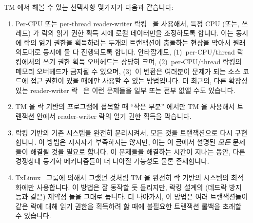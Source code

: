 TM 에서 해볼 수 있는 선택사항 몇가지가 다음과 같습니다:

\begin{enumerate}
\item	Per-CPU 또는 per-thread reader-writer 락킹~\cite{WilsonCHsieh92a} 을
	사용해서, 특정 CPU (또는, 쓰레드) 가 락의 읽기 권한 획득 시에 로컬
	데이터만을 조정하도록 합니다.
	이는 동시에 락의 읽기 권한을 획득하려는 두개의 트랜잭션이 충돌하는
	현상을 막아서 원래 의도대로 동시에 둘 다 진행되도록 합니다.
	안타깝게도, (1)~per-CPU/thread 락킹에서의 쓰기 권한 획득 오버헤드는
	상당히 크며, (2)~per-CPU/thread 락킹의 메모리 오버헤드가 금지될 수
	있으며, (3)~이 변환은 여러분이 문제가 되는 소스 코드에 접근 권한이 있을
	때에만 사용할 수 있는 방법입니다.
	더 최근의, 다른 확장성 있는 reader-writer
	락~\cite{YossiLev2009SNZIrwlock} 은 이런 문제들을 일부 또는 전부 없앨
	수도 있습니다.

\item	TM 을 락 기반의 프로그램에 접목할 때 ``작은 부분'' 에서만 TM 을
	사용해서 트랜잭션 안에서 reader-writer 락의 일기 권한 획득을 막습니다.
\item	락킹 기반의 기존 시스템을 완전히 분리시켜서, 모든 것을 트랜잭션으로
	다시 구현합니다.
	이 방법은 지지자가 부족하지는 않지만, 이는 이 글에서 설명된 \emph{모든}
	문제들이 해결될 것을 필요로 합니다.
	이 문제들을 해결하는 시간이 지나는 동안, 다른 경쟁상대 동기화
	메커니즘들이 더 나아질 가능성도 물론 존재합니다.
\item	TxLinux~\cite{ChistopherJRossbach2007a} 그룹에 의해서 그랬던 것처럼 TM
	을 완전히 락 기반의 시스템의 최적화에만 사용합니다.
	이 방법은 잘 동작할 듯 들리지만, 락킹 설계의 (데드락 방지 등과 같은)
	제약점 들을 그대로 둡니다.
	더 나아가서, 이 방법은 여러 트랜잭션들이 같은 락에 대해 읽기 권한을
	획득하려 핧 때에 불필요한 트랜잭션 롤백을 초래할 수 있습니다.
\iffalse


\end{enumerate}
